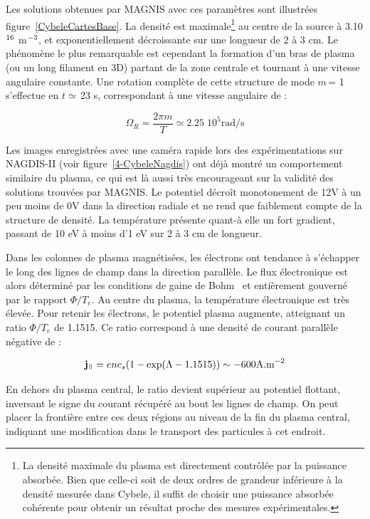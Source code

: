 \begin{refsection}
Les solutions obtenues par MAGNIS avec ces paramètres sont illustrées
figure~\ref{CybeleCartesBase}. La densité est maximale\footnote{La
densité maximale du plasma est directement contrôlée par la puissance
absorbée. Bien que celle-ci soit de deux ordres de grandeur inférieure à la
densité mesurée dans Cybele, il suffit de choisir une puissance absorbée
cohérente pour obtenir un résultat proche des mesures expérimentales.} au centre
de la source à 3.10$^{{16}}$ m$^{{-3}}$, et
exponentiellement décroissante sur une longueur de 2 à 3 cm. Le phénomène le plus
remarquable est cependant la formation d'un bras de plasma (ou un long filament
en 3D) partant de la zone centrale et tournant à une vitesse angulaire
constante.
Une rotation complète de cette structure de mode $m\,$= 1 s'effectue en
$t\simeq\,$23 \micro s, correspondant à une vitesse angulaire de :

\begin{equation}
\Omega_R=\frac{2\pi m}{T}\simeq2.25\;10^5\text{rad/s}
\end{equation}

Les images enregistrées avec une caméra rapide lors des expérimentations
sur NAGDIS-II (voir figure~\ref{4-CybeleNagdis}) ont déjà montré un comportement
similaire du plasma, ce qui est là aussi très
encourageant sur la validité des solutions trouvées par MAGNIS. Le potentiel
décroît monotonement de 12V à un peu moins de 0V dans la direction radiale et
ne rend que faiblement compte de la structure de densité.
 La température présente quant-à elle un fort gradient, passant de 10 eV à moins
 d'1 eV sur 2 à 3 cm de longueur.

Dans les colonnes de plasma magnétisées, les électrons ont tendance à s'échapper
le long des lignes de champ dans la direction parallèle. Le flux électronique
est alors déterminé par les conditions de gaine de Bohm~\parencite{Stangeby} et
entièrement gouverné par le rapport $\Phi/T_e$. Au centre du plasma, la
température électronique est très élevée. Pour retenir les électrons, le
potentiel plasma augmente, atteignant un ratio $\Phi/T_e$ de 1.1515. Ce ratio
correspond à une densité de courant parallèle négative de :

\begin{equation}
\mathbf j_\para=enc_s(1-\exp(\Lambda-1.1515))\sim -600\text{A.m}\puissance{-2}
\end{equation}

En dehors du plasma central, le ratio devient supérieur
au potentiel flottant, inversant le signe du courant récupéré au bout les lignes
de champ. On peut placer la frontière entre ces deux régions au niveau
de la fin du plasma central, indiquant une modification dans le transport des
particules à cet endroit.


\end{refsection}
